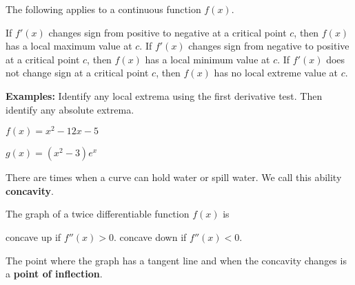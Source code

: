 \documentclass[addpoints, 12pt]{exam}
\begin{document}
\begin{tcolorbox}[title= THE FIRST DERIVATIVE TEST,black,sharp corners,colback=white,colbacktitle=white,coltitle=black,boxrule=1pt]

    The following applies to a continuous function $f(x)$.
    \begin{questions}
        \question If $f'(x)$ changes sign from positive to negative at a critical point $c$, then $f(x)$ has a local maximum value at $c$.
        \question If $f'(x)$ changes sign from negative to positive at a critical point $c$, then $f(x)$ has a local minimum value at $c$.
        \question If $f'(x)$ does not change sign at a critical point $c$, then $f(x)$ has no local extreme value at $c$.
    \end{questions}
    
    
\end{tcolorbox}
\vspace{.15cm}
\textbf{Examples:} Identify any local extrema using the first derivative test. Then identify any absolute extrema.
\begin{questions}
    \begin{minipage}{.45\linewidth}
        \question $\displaystyle f(x)=x^2-12x-5$
    \end{minipage}
    \hfill
    \begin{minipage}{.45\linewidth}
        \question $\displaystyle g(x)=\left(x^2-3\right)e^x$
    \end{minipage}
\end{questions}


There are times when a curve can hold water or spill water. We call this ability \textbf{concavity}.\\

\begin{tcolorbox}[title= THE CONCAVITY TEST,black,sharp corners,colback=white,colbacktitle=white,coltitle=black,boxrule=1pt]

    The graph of a twice differentiable function $f(x)$ is
    \begin{questions}
        \question concave up if $f''(x)>0$.
        \question concave down if $f''(x)<0$.
    \end{questions}
    
    The point where the graph has a tangent line and when the concavity changes is a \textbf{point of inflection}.
    
\end{tcolorbox}
\end{document}
